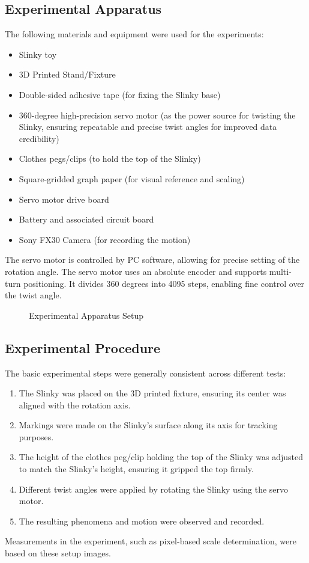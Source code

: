 \documentclass{mcmthesis}  %
\begin{document}
\subsection{Experimental Apparatus}
The following materials and equipment were used for the experiments:
\begin{itemize}
    \item Slinky toy
    \item 3D Printed Stand/Fixture
    \item Double-sided adhesive tape (for fixing the Slinky base)
    \item 360-degree high-precision servo motor (as the power source for twisting the Slinky, ensuring repeatable and precise twist angles for improved data credibility)
    \item Clothes pegs/clips (to hold the top of the Slinky)
    \item Square-gridded graph paper (for visual reference and scaling)
    \item Servo motor drive board
    \item Battery and associated circuit board
    \item Sony FX30 Camera (for recording the motion)
\end{itemize}
The servo motor is controlled by PC software, allowing for precise setting of the rotation angle. The servo motor uses an absolute encoder and supports multi-turn positioning. It divides 360 degrees into 4095 steps, enabling fine control over the twist angle.

\begin{figure}[h!]
    \centering
    \caption{Experimental Apparatus Setup}
    \label{fig:exp_apparatus}
\end{figure}

\subsection{Experimental Procedure}
The basic experimental steps were generally consistent across different tests:
\begin{enumerate}
    \item The Slinky was placed on the 3D printed fixture, ensuring its center was aligned with the rotation axis.
    \item Markings were made on the Slinky's surface along its axis for tracking purposes.
    \item The height of the clothes peg/clip holding the top of the Slinky was adjusted to match the Slinky's height, ensuring it gripped the top firmly.
    \item Different twist angles were applied by rotating the Slinky using the servo motor.
    \item The resulting phenomena and motion were observed and recorded.
\end{enumerate}
Measurements in the experiment, such as pixel-based scale determination, were based on these setup images.
\end{document}
